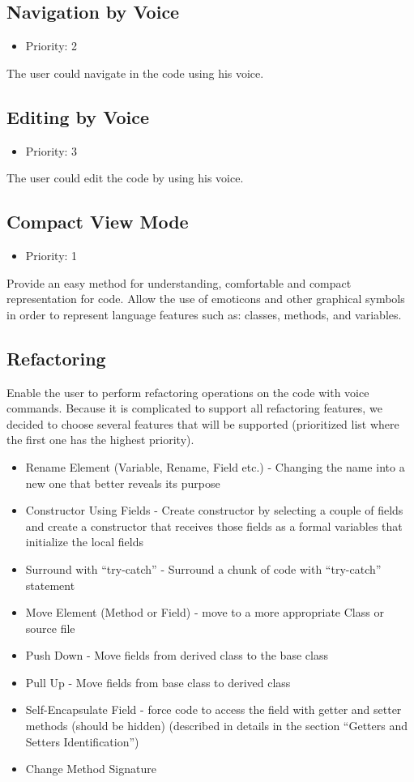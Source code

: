 \subsection{Navigation by Voice} \label{ssec:num1}
\begin{itemize}
	\item Priority: 2
\end{itemize}
The user could navigate in the code using his voice.
\subsection{Editing by Voice}
\begin{itemize}
	\item Priority: 3
\end{itemize}
The user could edit the code by using his voice.
\subsection{Compact View Mode}
\begin{itemize}
	\item Priority: 1
\end{itemize}
Provide an easy method for understanding, comfortable and compact representation for code. Allow the use of emoticons and other graphical symbols in order to represent language features such as: classes, methods, and variables.
\subsection{Refactoring}
Enable the user to perform refactoring operations on the code with voice commands. Because it is complicated to support all refactoring features, we decided to choose several features that will be supported (prioritized list where the first one has the highest priority).
\begin{itemize}
	\item Rename Element (Variable, Rename, Field etc.) - Changing the name into a new one that better reveals its purpose
	\item Constructor Using Fields - Create constructor by selecting a couple of fields and create a constructor that receives those fields as a formal variables that initialize the local fields
	\item Surround with “try-catch” - Surround a chunk of code with “try-catch” statement
	\item Move Element (Method or Field) - move to a more appropriate Class or source file
	\item Push Down - Move fields from derived class to the base class
	\item Pull Up - Move fields from base class to derived class
	\item Self-Encapsulate Field - force code to access the field with getter and setter methods (should be hidden) (described in details in the section “Getters and Setters Identification”)
	\item Change Method Signature
\end{itemize}
